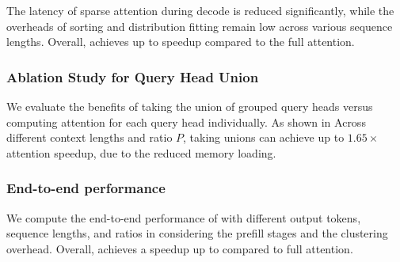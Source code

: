 The latency of sparse attention during decode is reduced significantly, while the overheads of sorting and distribution fitting remain low across various sequence lengths. Overall, \sys achieves up to \attnspeedup speedup compared to the full attention.

\subsubsection{Ablation Study for Query Head Union}

We evaluate the benefits of taking the union of grouped query heads versus computing attention for each query head individually. As shown in  Across different context lengths and ratio $P$, taking unions can achieve up to $1.65\times$ attention speedup, due to the reduced memory loading.


\subsubsection{End-to-end performance}
\label{sec:eval:e2e}

We compute the end-to-end performance of \sys with different output tokens, sequence lengths, and ratios in  considering the prefill stages and the clustering overhead. Overall, \sys achieves a speedup up to \etoespeedup compared to full attention.

















